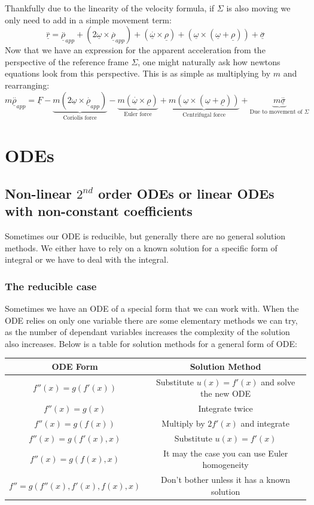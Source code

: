 \documentclass[12pt]{article}
\begin{document}
Thankfully due to the linearity of the velocity formula, if \(\Sigma\) is also moving we only need to add in a simple movement term:
\[\overset{..}{\underline{r}}=\overset{..}{\underline{\rho}}_{app}+\left(2\underline{\omega}\times\overset{.}{\underline{\rho}}_{app}\right)+\left(\overset{.}{\underline{\omega}}\times\underline{\rho}\right)+\left(\underline{\omega}\times\left(\underline{\omega}+\underline{\rho}\right)\right)+\overset{..}{\underline{\sigma}}\]
Now that we have an expression for the apparent acceleration from the perspective of the reference frame \(\Sigma\), one might naturally ask how newtons equations look from this perspective. This is as simple as multiplying by \(m\) and rearranging:
\[m\overset{..}{\underline{\rho}}_{app}=\underline{F}-\underbrace{m\left(2\underline{\omega}\times\overset{.}{\underline{\rho}}_{app}\right)}_{\text{Coriolis force}}-\underbrace{m\left(\overset{.}{\underline{\omega}}\times\underline{\rho}\right)}_{\text{Euler force}}+\underbrace{m\left(\underline{\omega}\times\left(\underline{\omega}+\underline{\rho}\right)\right)}_{\text{Centrifugal force}}+\underbrace{m\overset{..}{\underline{\sigma}}}_{\text{Due to movement of }\Sigma}\]
\section*{ODEs}
\subsection*{Non-linear \(2^{nd}\) order ODEs or linear ODEs with non-constant coefficients}
Sometimes our ODE is reducible, but generally there are no general solution methods. We either have to rely on a known solution for a specific form of integral or we have to deal with the integral.
\subsubsection*{The reducible case}
Sometimes we have an ODE of a special form that we can work with. When the ODE relies on only one variable there are some elementary methods we can try, as the number of dependant variables increases the complexity of the solution also increases. Below is a table for solution methods for a general form of ODE:
\begin{table}[h]
    \begin{tabular}{|c|c|}
    \hline
        \textbf{ODE Form} & \textbf{Solution Method} \\ \hline
        \(f''(x)=g(f'(x))\) & Substitute \(u(x)=f'(x)\) and solve the new ODE \\ \hline
        \(f''(x)=g(x)\) & Integrate twice \\ \hline
        \(f''(x)=g(f(x))\) & Multiply by \(2f'(x)\) and integrate \\ \hline
        \(f''(x)=g(f'(x),x)\) & Substitute \(u(x)=f'(x)\) \\ \hline 
        \(f''(x)=g(f(x),x)\) & It may the case you can use Euler homogeneity \\ \hline
        \(f''=g(f''(x),f'(x),f(x),x)\) & Don't bother unless it has a known solution \\ \hline
    \end{tabular}
\end{table}
\end{document}
